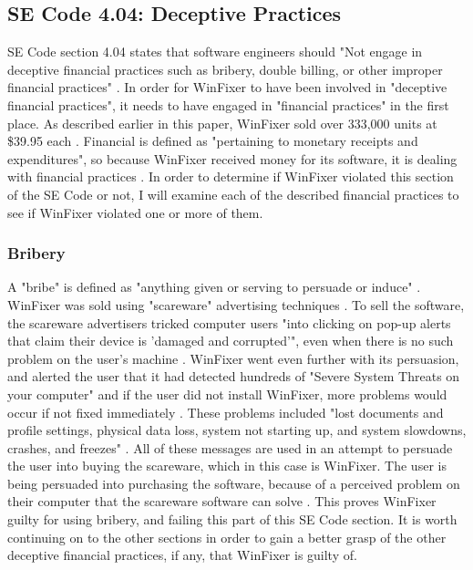 \documentclass[11pt]{article}
\begin{document}
\begin{multicols}{2}
\subsection{SE Code 4.04: Deceptive Practices}
SE Code section 4.04 states that software engineers should "Not engage in deceptive financial practices such as bribery, double billing, or other improper financial practices" \cite{secode}. In order for WinFixer to have been involved in "deceptive financial practices", it needs to have engaged in "financial practices" in the first place. As described earlier in this paper, WinFixer sold over 333,000 units at \$39.95 each \cite{pcworld8.2million}. Financial is defined as "pertaining to monetary receipts and expenditures", so because WinFixer received money for its software, it is dealing with financial practices \cite{dictionary}. In order to determine if WinFixer violated this section of the SE Code or not, I will examine each of the described financial practices to see if WinFixer violated one or more of them.
\subsubsection{Bribery}
A "bribe" is defined as "anything given or serving to persuade or induce" \cite{dictionary}. WinFixer was sold using "scareware" advertising techniques \cite{bbcmillionstricked}. To sell the software, the scareware advertisers tricked computer users "into clicking on pop-up alerts that claim their device is 'damaged and corrupted'", even when there is no such problem on the user's machine \cite{bbcfighting}. WinFixer went even further with its persuasion, and alerted the user that it had detected hundreds of "Severe System Threats on your computer" and if the user did not install WinFixer, more problems would occur if not fixed immediately \cite{symantecwinfixer}\cite{mcafeewinfixer}. These problems included "lost documents and profile settings, physical data loss, system not starting up, and system slowdowns, crashes, and freezes" \cite{symantecwinfixer}\cite{mcafeewinfixer}. All of these messages are used in an attempt to persuade the user into buying the scareware, which in this case is WinFixer. The user is being persuaded into purchasing the software, because of a perceived problem on their computer that the scareware software can solve \cite{bbcmillionstricked} \cite{bbcfighting}.  This proves WinFixer guilty for using bribery, and failing this part of this SE Code section. It is worth continuing on to the other sections in order to gain a better grasp of the other deceptive financial practices, if any, that WinFixer is guilty of.

\end{multicols}
\end{document}
